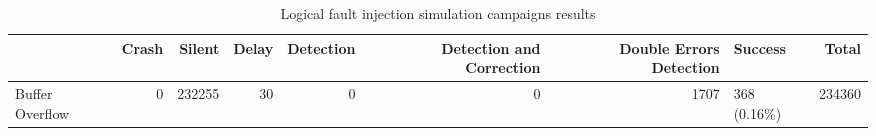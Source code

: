 \begin{table}[t]
\centering
\caption{Logical fault injection simulation campaigns results}
\label{table:end_sim_by_status_secded_single_bitflip_spatial}
\begin{tabular}{lrrrrrrlr}
\toprule
 & Crash & Silent & Delay & Detection & Detection and Correction & Double Errors Detection & Success & Total \\
\midrule
Buffer Overflow & 0 & 232255 & 30 & 0 & 0 & 1707 & 368 (0.16\%) & 234360 \\
\bottomrule
\end{tabular}
\end{table}
